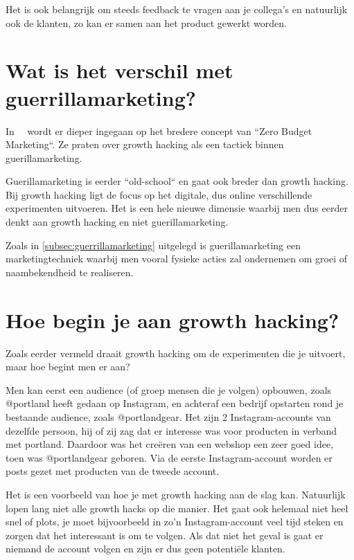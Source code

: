 Het is ook belangrijk om steeds feedback te vragen aan je collega's en natuurlijk ook de klanten, zo kan er samen aan het product gewerkt worden.

\section{Wat is het verschil met guerrillamarketing?} \label{sec:verschil-met-guerrillamarketing}

In~~\autocite{fizzle.co2015} wordt er dieper ingegaan op het bredere concept van ``Zero Budget Marketing``. Ze praten over growth hacking als een tactiek binnen guerillamarketing. 

Guerillamarketing is eerder ``old-school`` en gaat ook breder dan growth hacking. Bij growth hacking ligt de focus op het digitale, dus online verschillende experimenten uitvoeren. Het is een hele nieuwe dimensie waarbij men dus eerder denkt aan growth hacking en niet guerillamarketing.

Zoals in \ref{subsec:guerrillamarketing} uitgelegd is guerillamarketing een marketingtechniek waarbij men vooral fysieke acties zal ondernemen om groei of naambekendheid te realiseren. 

\section{Hoe begin je aan growth hacking?} \label{sec:hoe-growth-hacking}
 
Zoals eerder vermeld draait growth hacking om de experimenten die je uitvoert, maar hoe begint men er aan?

Men kan eerst een audience (of groep mensen die je volgen) opbouwen, zoals @portland heeft gedaan op Instagram, en achteraf een bedrijf opstarten rond je bestaande audience, zoals @portlandgear. Het zijn 2 Instagram-accounts van dezelfde persoon, hij of zij zag dat er interesse was voor producten in verband met portland. Daardoor was het creëren van een webshop een zeer goed idee, toen was @portlandgear geboren. Via de eerste Instagram-account worden er posts gezet met producten van de tweede account.

Het is een voorbeeld van hoe je met growth hacking aan de slag kan. Natuurlijk lopen lang niet alle growth hacks op die manier. Het gaat ook helemaal niet heel snel of plots, je moet bijvoorbeeld in zo'n Instagram-account veel tijd steken en zorgen dat het interessant is om te volgen. Als dat niet het geval is gaat er niemand de account volgen en zijn er dus geen potentiële klanten.

